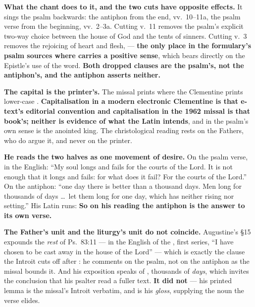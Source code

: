 \textbf{What the chant does to it, and the two cuts have opposite effects.} It
sings the psalm backwards: the antiphon from the end, vv.~10--11a, the psalm
verse from the beginning, vv.~2--3a. Cutting v.~11 removes the psalm's explicit
two-way choice between the house of God and the tents of sinners. Cutting v.~3
removes the rejoicing of heart and flesh,  --- \textbf{the only place in the formulary's psalm
sources where  carries a positive sense}, which bears directly on
the Epistle's use of the word. \textbf{Both dropped clauses are the psalm's,
not the antiphon's, and the antiphon asserts neither.}

\textbf{The capital is the printer's.} The missal
prints  where the Clementine prints lower-case
. \textbf{Capitalisation in a modern electronic Clementine is
that e-text's editorial convention and capitalisation in the 1962 missal is that
book's; neither is evidence of what the Latin intends}, and in the psalm's own
sense  is the anointed king. The christological reading rests on
the Fathers, who do argue it, and never on the printer.

\begin{witnessnote}
 \textbf{He reads the two
halves as one movement of desire.} On the psalm verse, in the  English: ``My soul longs and fails
for the courts of the Lord. It is not enough that it longs and fails: for what
does it fail? For the courts of the Lord.'' On the antiphon: ``one day there is
better than a thousand days. Men long for thousands of days \dots\ let them long
for one day, which has neither rising nor setting.'' His Latin runs:
 \textbf{So on his reading the antiphon is the answer to its own
verse.}
\end{witnessnote}

\textbf{The Father's unit and the liturgy's unit do not coincide.} Augustine's
§15 expounds the \emph{rest} of Ps.~83:11 --- in the English of the
, first series, ``I have chosen to
be cast away in the house of the Lord'' --- which is exactly the clause the
Introit cuts off after
: he comments on the psalm, not on the antiphon as the missal
bounds it. And his
exposition speaks of , thousands of \emph{days}, which
invites the conclusion that his psalter read a fuller text. \textbf{It did not} ---
his printed lemma is the missal's Introit verbatim, and  is
his \emph{gloss}, supplying the noun the verse elides.

